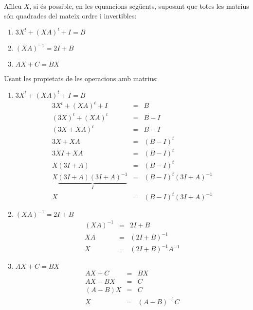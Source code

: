\Exercise
  Aïlleu $X$, si és possible, en les equancions següents, suposant que totes les matrius són quadrades del mateix ordre i invertibles:
  \begin{enumerate}[label=(\alph*) ]
    \item $3 X^t+ (XA)^t + I = B$
    \item $(XA)^{-1}=2I+B$
    \item $AX+C=BX$
  \end{enumerate}

\Answer Usant les propietats de les operacions amb matrius:

  \begin{enumerate}[label=(\alph*) ]
    \item $3 X^t+ (XA)^t + I = B$
    \begin{eqnarray*}
      3 X^t+ (XA)^t + I &=&B\\
      (3X)^t + (XA)^t &=& B-I\\
      (3X+XA)^t &=& B-I\\
      3X+XA &=& (B-I)^t\\
      3XI+XA &=& (B-I)^t\\
      X(3I+A) &=& (B-I)^t\\
      X\underbrace{(3I+A)(3I+A)^{-1}}_{I} &=& (B-I)^t(3I+A)^{-1}\\
      X &=& (B-I)^t(3I+A)^{-1}
    \end{eqnarray*}
    \blacksquare

    \item $(XA)^{-1}=2I+B$
    \begin{eqnarray*}
      (XA)^{-1}&=&2I+B\\
      XA&=&(2I+B)^{-1}\\
      X&=&(2I+B)^{-1}A^{-1}
    \end{eqnarray*}
    \blacksquare

    \item $AX+C=BX$
    \begin{eqnarray*}
      AX+C&=&BX\\
      AX-BX&=&C\\
      (A-B)X&=&C\\
      X&=&(A-B)^{-1}C
    \end{eqnarray*}
    \blacksquare

  \end{enumerate}
